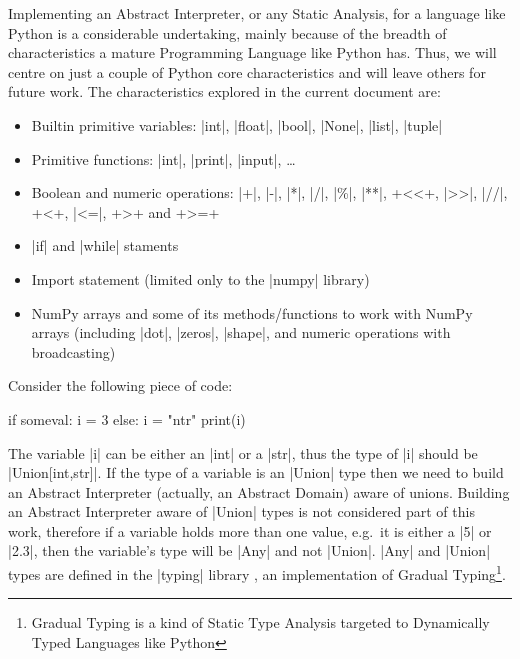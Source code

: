 Implementing an Abstract Interpreter, or any Static Analysis, for a language like Python
is a considerable undertaking, mainly because of the breadth of characteristics a mature
Programming Language like Python has. Thus, we will centre on just a couple of Python core
characteristics and will leave others for future work. The characteristics explored in the
current document are:

\begin{itemize}
\tightlist
\item
  Builtin primitive variables: \pycode|int|, \pycode|float|, \pycode|bool|, \pycode|None|,
  \pycode|list|, \pycode|tuple|
\item
  Primitive functions: \pycode|int|, \pycode|print|, \pycode|input|,
  \ldots{}
\item
  Boolean and numeric operations: \pycode|+|, \pycode|-|, \pycode|*|, \pycode|/|,
  \pycode|\%|, \pycode|**|, \pycode+<<+, \pycode|>>|, \pycode|//|, \pycode+<+,
  \pycode|<=|, \pycode+>+ and \pycode+>=+
\item
  \pycode|if| and \pycode|while| staments
\item
  Import statement (limited only to the \pycode|numpy| library)
\item
  NumPy arrays and some of its methods/functions to work with NumPy arrays (including
  \pycode|dot|, \pycode|zeros|, \pycode|shape|, and numeric operations with broadcasting)
\end{itemize}

Consider the following piece of code:

\begin{pythoncode}
if someval:
  i = 3
else:
  i = "ntr"
print(i)
\end{pythoncode}

The variable \pycode|i| can be either an \pycode|int| or a \pycode|str|,
thus the type of \pycode|i| should be \pycode|Union[int,str]|. If
the type of a variable is an \pycode|Union| type then we need to build
an Abstract Interpreter (actually, an Abstract Domain) aware of unions.
Building an Abstract Interpreter aware of \pycode|Union| types is not
considered part of this work, therefore if a variable holds more than
one value, e.g.~it is either a \pycode|5| or \pycode|2.3|, then the
variable's type will be \pycode|Any| and not \pycode|Union|.
\pycode|Any| and \pycode|Union| types are defined in the \pycode|typing|
library \autocite{pep484}, an implementation of Gradual Typing\footnote{Gradual
  Typing is a kind of Static Type Analysis targeted to Dynamically Typed
  Languages like Python}.

